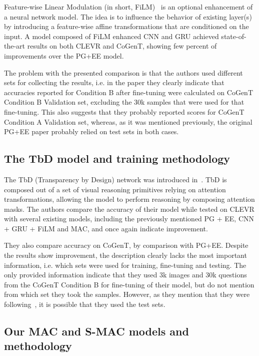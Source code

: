 Feature-wise Linear Modulation (in short, FiLM)~\cite{perez2017film} is an optional enhancement of a neural network model.
The idea is to influence the behavior of existing layer(s) by introducing a feature-wise affine transformations that are conditioned on the input.
A model composed of FiLM enhanced CNN and GRU achieved state-of-the-art results on both CLEVR and CoGenT, showing few percent of improvements over the PG+EE model.

The problem with the presented comparison is that the authors used different sets for collecting the results, i.e. in the paper they clearly indicate that accuracies reported for Condition B after fine-tuning were calculated on CoGenT Condition B Validation set, excluding the 30k samples that were used for that fine-tuning.
This also suggests that they probably reported scores for CoGenT Condition A Validation set,
whereas, as it was mentioned previously, the original PG+EE paper probably relied on test sets in both cases.


\subsection{The TbD model and training methodology}

The TbD (Transparency by Design) network was introduced in~\cite{mascharka2018transparency}.
TbD is composed out of a set of visual reasoning primitives relying on attention transformations, allowing the model to perform reasoning by composing  attention masks.
The authors compare the accuracy of their model while tested on CLEVR  with several existing models, including the previously mentioned PG + EE, CNN + GRU + FiLM and MAC, and once again indicate improvement.

They also compare accuracy on CoGenT, by comparison with PG+EE.
Despite the results show improvement, the description clearly lacks the most important information, i.e. which sets were used for training, fine-tuning and testing. 
The only provided information indicate that they used 3k images and 30k questions from the CoGenT Condition B for fine-tuning of their model, but do not mention from which set they took the samples.
However, as they mention that they were following~\cite{johnson2017inferring}, it is possible that they used the test sets.

\subsection{Our MAC and S-MAC models and methodology}

